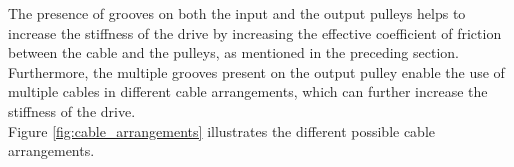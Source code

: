  The presence of grooves on both the input and the output pulleys helps to increase the stiffness of the drive by increasing the effective coefficient of friction between the cable and the pulleys, as mentioned in the preceding section. Furthermore, the multiple grooves present on the output pulley enable the use of multiple cables in different cable arrangements, which can further increase the stiffness of the drive.\\
Figure \ref{fig:cable_arrangements} illustrates the different possible cable arrangements. 
 \begin{figure}
    \centering
    \hspace{0.1\textwidth}
    

\end{figure}
